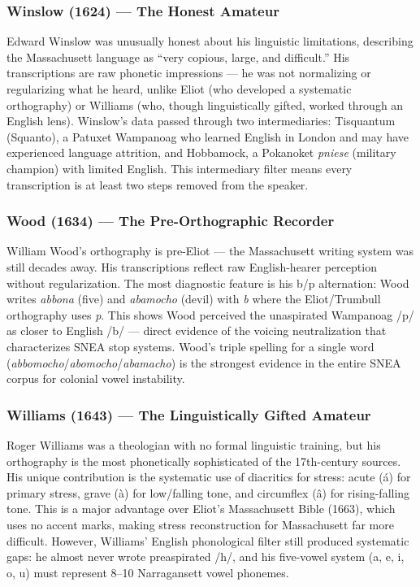 \subsubsection{Winslow (1624) --- The Honest Amateur}

Edward Winslow was unusually honest about his linguistic limitations,
describing the Massachusett language as ``very copious, large, and
difficult.'' His transcriptions are raw phonetic impressions --- he was not
normalizing or regularizing what he heard, unlike Eliot (who developed a
systematic orthography) or Williams (who, though linguistically gifted,
worked through an English lens). Winslow's data passed through two
intermediaries: Tisquantum (Squanto), a Patuxet Wampanoag who learned
English in London and may have experienced language attrition, and
Hobbamock, a Pokanoket \textit{pniese} (military champion) with limited
English. This intermediary filter means every transcription is at least two
steps removed from the speaker.

\subsubsection{Wood (1634) --- The Pre-Orthographic Recorder}

William Wood's orthography is pre-Eliot --- the Massachusett writing system
was still decades away. His transcriptions reflect raw English-hearer
perception without regularization. The most diagnostic feature is his b/p
alternation: Wood writes \textit{abbona} (five) and \textit{abamocho} (devil)
with \textit{b} where the Eliot/Trumbull orthography uses \textit{p}. This
shows Wood perceived the unaspirated Wampanoag /p/ as closer to English /b/
--- direct evidence of the voicing neutralization that characterizes SNEA
stop systems. Wood's triple spelling for a single word
(\textit{abbomocho}/\textit{abomocho}/\textit{abamacho}) is the strongest
evidence in the entire SNEA corpus for colonial vowel instability.

\subsubsection{Williams (1643) --- The Linguistically Gifted Amateur}

Roger Williams was a theologian with no formal linguistic training, but his
orthography is the most phonetically sophisticated of the 17th-century
sources. His unique contribution is the systematic use of diacritics for
stress: acute (á) for primary stress, grave (à) for low/falling tone, and
circumflex (â) for rising-falling tone. This is a major advantage over
Eliot's Massachusett Bible (1663), which uses no accent marks, making stress
reconstruction for Massachusett far more difficult. However, Williams'
English phonological filter still produced systematic gaps: he almost never
wrote preaspirated /h/, and his five-vowel system (a, e, i, o, u) must
represent 8--10 Narragansett vowel phonemes.


